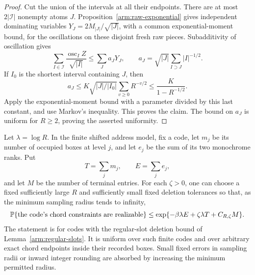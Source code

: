 \begin{proof}
Cut the union of the intervals at all their endpoints.  There are at
most $2|\mathcal I|$ nonempty atoms $J$.  Proposition~\ref{arm:raw-exponential}
gives independent dominating variables
$Y_J=2M_{|J|}/\sqrt{|J|}$, with a common exponential-moment bound, for
the oscillations on these disjoint fresh raw pieces.  Subadditivity
of oscillation gives
\[
 \sum_{I\in\mathcal I}\frac{\operatorname{osc}_I Z}{\sqrt{|I|}}
 \le\sum_J a_JY_J,
 \qquad
 a_J=\sqrt{|J|}\sum_{I\supset J}|I|^{-1/2}.
\]
If $I_0$ is the shortest interval containing $J$, then
\[
 a_J\le K\sqrt{|J|/|I_0|}
             \sum_{v\ge0}R^{-v/2}
 \le \frac K{1-R^{-1/2}}.
\]
Apply the exponential-moment bound with a parameter divided by this
last constant, and use Markov's inequality.  This proves the claim.
The bound on $a_J$ is uniform for $R\ge2$, proving the asserted
uniformity.
\end{proof}

\begin{proposition}\label{arm:fixed-code-test}
Let $\lambda=\log R$.  In the finite shifted address model, fix a code,
let $m_j$ be its number of occupied boxes at level $j$, and let $e_j$
be the sum of its two monochrome ranks.  Put
\[
 T=\sum_jm_j,\qquad E=\sum_je_j,
\]
and let $M$ be the number of terminal entries.  For each $\zeta>0$, one
can choose a fixed sufficiently large $R$ and sufficiently small fixed
deletion tolerances so that, as the minimum sampling radius tends to
infinity,
\begin{equation}\label{arm:fixed-code-probability}
 \mathbb P\{\hbox{the code's chord constraints are realizable}\}
 \le \exp\{-\beta\lambda E+\zeta\lambda T+C_{R,\zeta}M\}.
\end{equation}
The statement is for codes with the regular-slot deletion bound of
Lemma~\ref{arm:regular-slots}.  It is uniform over such finite codes
and over arbitrary exact chord endpoints inside their recorded boxes.
Small fixed errors in sampling radii or inward integer rounding are
absorbed by increasing the minimum permitted radius.
\end{proposition}

